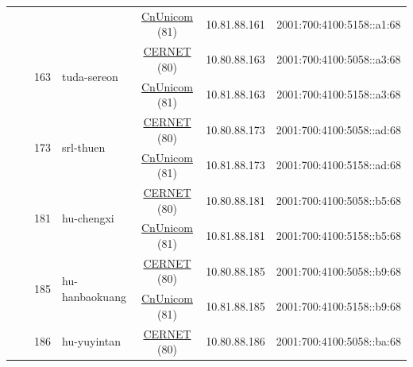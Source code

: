 \begin{small}
\begin{center}
\begin{longtable}{|c|c|c|c|c|c|c|c|}
  &  &  &  & \multicolumn{2}{|c|}{\tiny{\href{http://www.chinaunicom.com}{CnUnicom} (81)}} & \tiny{10.81.88.161} & \tiny{2001:700:4100:5158::a1:68} \\* \cline{3-3}\cline{4-4}\cline{5-5}\cline{6-6}\cline{7-7}\cline{8-8}
  &  & \multirow{2}{*}{\tiny{163}} & \multicolumn{1}{|l|}{\multirow{2}{*}{\tiny{tuda-sereon}}} & \multicolumn{2}{|c|}{\tiny{\href{http://www.cernet.edu.cn}{CERNET} (80)}} & \tiny{10.80.88.163} & \tiny{2001:700:4100:5058::a3:68} \\* \cline{5-5}\cline{6-6}\cline{7-7}\cline{8-8}
  &  &  &  & \multicolumn{2}{|c|}{\tiny{\href{http://www.chinaunicom.com}{CnUnicom} (81)}} & \tiny{10.81.88.163} & \tiny{2001:700:4100:5158::a3:68} \\* \cline{3-3}\cline{4-4}\cline{5-5}\cline{6-6}\cline{7-7}\cline{8-8}
  &  & \multirow{2}{*}{\tiny{173}} & \multicolumn{1}{|l|}{\multirow{2}{*}{\tiny{srl-thuen}}} & \multicolumn{2}{|c|}{\tiny{\href{http://www.cernet.edu.cn}{CERNET} (80)}} & \tiny{10.80.88.173} & \tiny{2001:700:4100:5058::ad:68} \\* \cline{5-5}\cline{6-6}\cline{7-7}\cline{8-8}
  &  &  &  & \multicolumn{2}{|c|}{\tiny{\href{http://www.chinaunicom.com}{CnUnicom} (81)}} & \tiny{10.81.88.173} & \tiny{2001:700:4100:5158::ad:68} \\* \cline{3-3}\cline{4-4}\cline{5-5}\cline{6-6}\cline{7-7}\cline{8-8}
  &  & \multirow{2}{*}{\tiny{181}} & \multicolumn{1}{|l|}{\multirow{2}{*}{\tiny{hu-chengxi}}} & \multicolumn{2}{|c|}{\tiny{\href{http://www.cernet.edu.cn}{CERNET} (80)}} & \tiny{10.80.88.181} & \tiny{2001:700:4100:5058::b5:68} \\* \cline{5-5}\cline{6-6}\cline{7-7}\cline{8-8}
  &  &  &  & \multicolumn{2}{|c|}{\tiny{\href{http://www.chinaunicom.com}{CnUnicom} (81)}} & \tiny{10.81.88.181} & \tiny{2001:700:4100:5158::b5:68} \\* \cline{3-3}\cline{4-4}\cline{5-5}\cline{6-6}\cline{7-7}\cline{8-8}
  &  & \multirow{2}{*}{\tiny{185}} & \multicolumn{1}{|l|}{\multirow{2}{*}{\tiny{hu-hanbaokuang}}} & \multicolumn{2}{|c|}{\tiny{\href{http://www.cernet.edu.cn}{CERNET} (80)}} & \tiny{10.80.88.185} & \tiny{2001:700:4100:5058::b9:68} \\* \cline{5-5}\cline{6-6}\cline{7-7}\cline{8-8}
  &  &  &  & \multicolumn{2}{|c|}{\tiny{\href{http://www.chinaunicom.com}{CnUnicom} (81)}} & \tiny{10.81.88.185} & \tiny{2001:700:4100:5158::b9:68} \\* \cline{3-3}\cline{4-4}\cline{5-5}\cline{6-6}\cline{7-7}\cline{8-8}
  &  & \multirow{2}{*}{\tiny{186}} & \multicolumn{1}{|l|}{\multirow{2}{*}{\tiny{hu-yuyintan}}} & \multicolumn{2}{|c|}{\tiny{\href{http://www.cernet.edu.cn}{CERNET} (80)}} & \tiny{10.80.88.186} & \tiny{2001:700:4100:5058::ba:68} \\* \cline{5-5}\cline{6-6}\cline{7-7}\cline{8-8}

\end{longtable}
\end{center}
\end{small}
